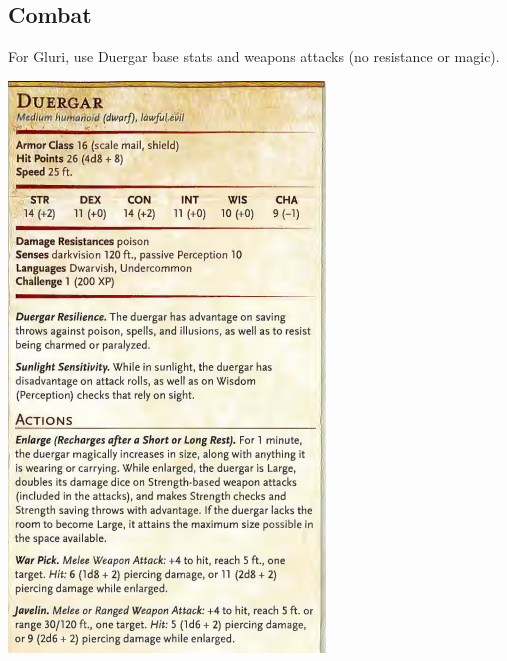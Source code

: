 \subsection{Combat}
For Gluri, use Duergar base stats and weapons attacks (no resistance or magic).
\begin{multicols}{2}

\includegraphics[width=\linewidth,keepaspectration=true]{img/statblock/duergar-clipped.png}


\end{multicols}
